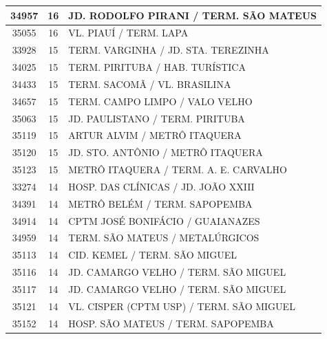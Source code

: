 \documentclass[
	12pt,				%
	oneside,			%
	a4paper,			%
	english,			%
	brazil				%
	]{abntex2ppgsi}
\begin{document}
{{\begin{apendicesenv}
\begin{longtable}{c|c|p{7cm}}
    34957 & 16    & JD. RODOLFO PIRANI / TERM. SÃO MATEUS \\
\hline

    35055 & 16    & VL. PIAUÍ / TERM. LAPA \\
\hline

    33928 & 15    & TERM. VARGINHA / JD. STA. TEREZINHA \\
\hline

    34025 & 15    & TERM. PIRITUBA / HAB. TURÍSTICA \\
\hline

    34433 & 15    & TERM. SACOMÃ / VL. BRASILINA \\
\hline

    34657 & 15    & TERM. CAMPO LIMPO / VALO VELHO \\
\hline

    35063 & 15    & JD. PAULISTANO / TERM. PIRITUBA \\
\hline

    35119 & 15    & ARTUR ALVIM / METRÔ ITAQUERA \\
\hline

    35120 & 15    & JD. STO. ANTÔNIO / METRÔ ITAQUERA \\
\hline

    35123 & 15    & METRÔ ITAQUERA / TERM. A. E. CARVALHO \\
\hline

    33274 & 14    & HOSP. DAS CLÍNICAS / JD. JOÃO XXIII \\
\hline

    34391 & 14    & METRÔ BELÉM / TERM. SAPOPEMBA \\
\hline

    34914 & 14    & CPTM JOSÉ BONIFÁCIO / GUAIANAZES \\
\hline

    34959 & 14    & TERM. SÃO MATEUS / METALÚRGICOS \\
\hline

    35113 & 14    & CID. KEMEL / TERM. SÃO MIGUEL \\
\hline

    35116 & 14    & JD. CAMARGO VELHO / TERM. SÃO MIGUEL \\
\hline

    35117 & 14    & JD. CAMARGO VELHO / TERM. SÃO MIGUEL \\
\hline

    35121 & 14    & VL. CISPER (CPTM USP) / TERM. SÃO MIGUEL \\
\hline

    35152 & 14    & HOSP. SÃO MATEUS / TERM. SAPOPEMBA \\
\hline


\end{longtable}
\end{apendicesenv}}}
\end{document}

